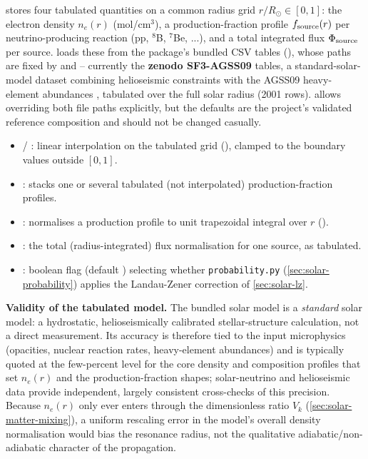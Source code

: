 \begin{implbox}
 stores four tabulated quantities on a common radius
grid $r/R_\odot\in[0,1]$: the electron density $n_e(r)$ (mol/cm$^3$), a
production-fraction profile $f_{\rm source}(r)$ per neutrino-producing
reaction (pp, $^8$B, $^7$Be, ...), and a total integrated flux
$\Phi_{\rm source}$ per source.  loads these
from the package's bundled CSV tables (), whose
paths are fixed by 
and  -- currently the \textbf{zenodo
SF3-AGSS09} tables, a standard-solar-model dataset combining helioseismic
constraints with the AGSS09 heavy-element abundances
\parencite{Vinyoles2017B16}, tabulated over the full solar radius (2001
rows).  allows overriding both file paths
explicitly, but the defaults are the project's validated reference
composition and should not be changed casually.
\begin{itemize}
  \item {} / :
    linear interpolation on the tabulated grid (),
    clamped to the boundary values outside $[0,1]$.
  \item {}: stacks one or several tabulated
    (not interpolated) production-fraction profiles.
  \item {}: normalises a production
    profile to unit trapezoidal integral over $r$
    ().
  \item {}: the total (radius-integrated) flux
    normalisation for one source, as tabulated.
  \item {}: boolean flag (default ) selecting
    whether \texttt{probability.py} (\cref{sec:solar-probability}) applies
    the Landau-Zener correction of \cref{sec:solar-lz}.
\end{itemize}
\end{implbox}

\begin{notebox}
\textbf{Validity of the tabulated model.} The bundled solar model is a
\emph{standard} solar model: a hydrostatic, helioseismically calibrated
stellar-structure calculation, not a direct measurement. Its accuracy is
therefore tied to the input microphysics (opacities, nuclear reaction
rates, heavy-element abundances) and is typically quoted at the few-percent
level for the core density and composition profiles that set $n_e(r)$ and
the production-fraction shapes; solar-neutrino and helioseismic data
provide independent, largely consistent cross-checks of this precision.
Because $n_e(r)$ only ever enters through the dimensionless ratio $V_k$
(\cref{sec:solar-matter-mixing}), a uniform rescaling error in the model's
overall density normalisation would bias the resonance radius, not the
qualitative adiabatic/non-adiabatic character of the propagation.
\end{notebox}

